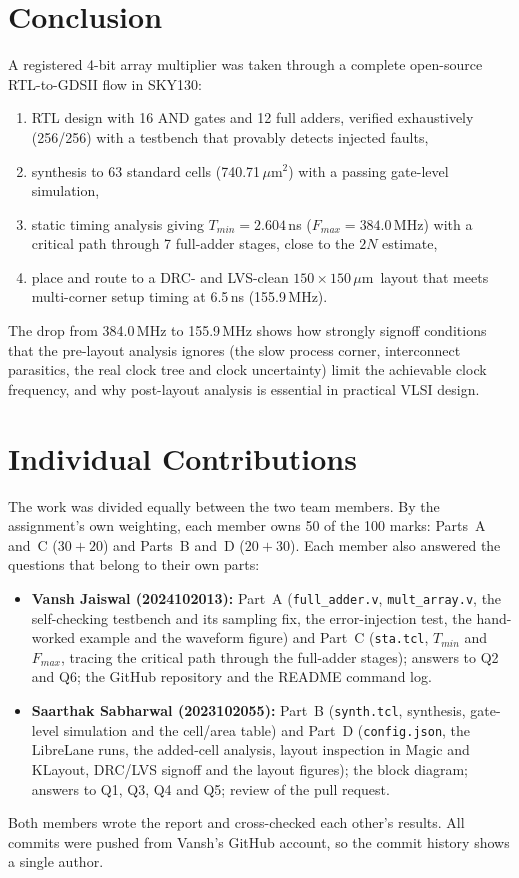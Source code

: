 \documentclass[conference]{IEEEtran}
\newcommand{\um}{\,$\mu$m}
\newcommand{\umsq}{\,$\mu$m$^2$}
\begin{document}
\section{Conclusion}
A registered 4-bit array multiplier was taken through a complete open-source RTL-to-GDSII flow in SKY130:
\begin{enumerate}
    \item RTL design with 16 AND gates and 12 full adders, verified exhaustively (256/256) with a testbench
          that provably detects injected faults,
    \item synthesis to 63 standard cells (740.71\umsq) with a passing gate-level simulation,
    \item static timing analysis giving $T_{min} = 2.604$\,ns ($F_{max} = 384.0$\,MHz) with a critical path
          through 7 full-adder stages, close to the $2N$ estimate,
    \item place and route to a DRC- and LVS-clean $150\times150$\um\ layout that meets multi-corner setup
          timing at 6.5\,ns (155.9\,MHz).
\end{enumerate}
The drop from 384.0\,MHz to 155.9\,MHz shows how strongly signoff conditions that the pre-layout analysis
ignores (the slow process corner, interconnect parasitics, the real clock tree and clock uncertainty) limit
the achievable clock frequency, and why post-layout analysis is essential in practical VLSI design.

\section{Individual Contributions}
The work was divided equally between the two team members. By the assignment's own weighting, each member
owns 50 of the 100 marks: Parts~A and~C ($30+20$) and Parts~B and~D ($20+30$). Each member also answered
the questions that belong to their own parts:
\begin{itemize}\raggedright
    \item \textbf{Vansh Jaiswal (2024102013):} Part~A (\texttt{full\_adder.v}, \texttt{mult\_array.v}, the
          self-checking testbench and its sampling fix, the error-injection test, the hand-worked example and
          the waveform figure) and Part~C (\texttt{sta.tcl}, $T_{min}$ and $F_{max}$, tracing the critical path
          through the full-adder stages); answers to Q2 and Q6; the GitHub repository and the README command log.
    \item \textbf{Saarthak Sabharwal (2023102055):} Part~B (\texttt{synth.tcl}, synthesis, gate-level
          simulation and the cell/area table) and Part~D (\texttt{config.json}, the LibreLane runs, the
          added-cell analysis, layout inspection in Magic and KLayout, DRC/LVS signoff and the layout figures);
          the block diagram; answers to Q1, Q3, Q4 and Q5; review of the pull request.
\end{itemize}
Both members wrote the report and cross-checked each other's results. All commits were pushed from Vansh's
GitHub account, so the commit history shows a single author.
\end{document}
